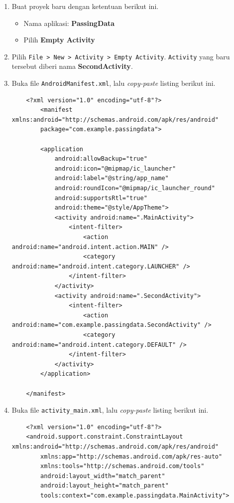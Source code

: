 \documentclass{scrartcl}
\begin{document}
\begin{enumerate}
	\item Buat proyek baru dengan ketentuan berikut ini.
	\begin{itemize}
		\item Nama aplikasi: \textbf{PassingData}
		\item Pilih \textbf{Empty Activity}
	\end{itemize}

	\item Pilih \texttt{File > New > Activity > Empty Activity}. \texttt{Activity} yang baru tersebut diberi nama \textbf{SecondActivity}.
	
	\item Buka file \texttt{AndroidManifest.xml}, lalu \textit{copy-paste} listing berikut ini.
	
	\begin{verbatim}
	<?xml version="1.0" encoding="utf-8"?>
		<manifest xmlns:android="http://schemas.android.com/apk/res/android"
		package="com.example.passingdata">
		
		<application
			android:allowBackup="true"
			android:icon="@mipmap/ic_launcher"
			android:label="@string/app_name"
			android:roundIcon="@mipmap/ic_launcher_round"
			android:supportsRtl="true"
			android:theme="@style/AppTheme">
			<activity android:name=".MainActivity">
				<intent-filter>
					<action android:name="android.intent.action.MAIN" />
					<category android:name="android.intent.category.LAUNCHER" />
				</intent-filter>
			</activity>
			<activity android:name=".SecondActivity">
				<intent-filter>
					<action android:name="com.example.passingdata.SecondActivity" />
					<category android:name="android.intent.category.DEFAULT" />
				</intent-filter>
			</activity>
		</application>
	
	</manifest>
	\end{verbatim}
	
	\item Buka file \texttt{activity\_main.xml}, lalu \textit{copy-paste} listing berikut ini.
	
	\begin{verbatim}
	<?xml version="1.0" encoding="utf-8"?>
	<android.support.constraint.ConstraintLayout xmlns:android="http://schemas.android.com/apk/res/android"
		xmlns:app="http://schemas.android.com/apk/res-auto"
		xmlns:tools="http://schemas.android.com/tools"
		android:layout_width="match_parent"
		android:layout_height="match_parent"
		tools:context="com.example.passingdata.MainActivity">
		

\end{verbatim}
\end{enumerate}
\end{document}
